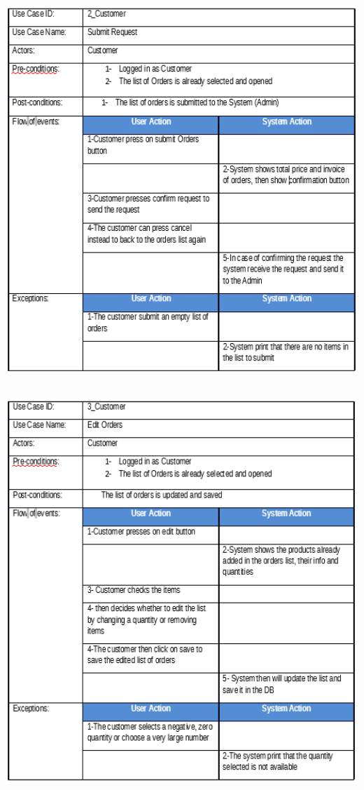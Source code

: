 \documentclass[12pt]{article}
\begin{document}
\begin{center}
	\includegraphics[width=17cm,height=15cm]{./assets/usecasetable/customer-2.png}\\
	\includegraphics[width=17cm,height=15cm]{./assets/usecasetable/customer-3.png}\\
\end{center}
\end{document}
